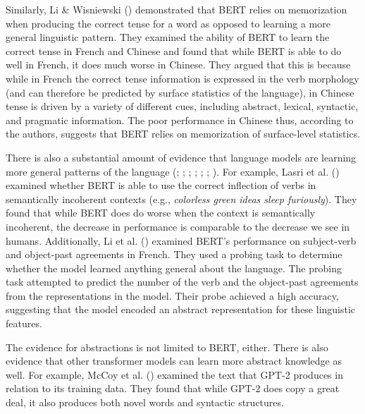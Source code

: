 \documentclass[
  12pt,
  letterpaper,
]{scrreprt}
\begin{document}
Similarly, Li \& Wisniewski
() demonstrated that BERT
relies on memorization when producing the correct tense for a word as
opposed to learning a more general linguistic pattern. They examined the
ability of BERT to learn the correct tense in French and Chinese and
found that while BERT is able to do well in French, it does much worse
in Chinese. They argued that this is because while in French the correct
tense information is expressed in the verb morphology (and can therefore
be predicted by surface statistics of the language), in Chinese tense is
driven by a variety of different cues, including abstract, lexical,
syntactic, and pragmatic information. The poor performance in Chinese
thus, according to the authors, suggests that BERT relies on
memorization of surface-level statistics.

There is also a substantial amount of evidence that language models are
learning more general patterns of the language
(;
;
;
;
;
; ). For example, Lasri et al.
() examined whether
BERT is able to use the correct inflection of verbs in semantically
incoherent contexts (e.g., \emph{colorless green ideas sleep
furiously}). They found that while BERT does do worse when the context
is semantically incoherent, the decrease in performance is comparable to
the decrease we see in humans. Additionally, Li et al.
() examined
BERT's performance on subject-verb and object-past agreements in French.
They used a probing task to determine whether the model learned anything
general about the language. The probing task attempted to predict the
number of the verb and the object-past agreements from the
representations in the model. Their probe achieved a high accuracy,
suggesting that the model encoded an abstract representation for these
linguistic features.

The evidence for abstractions is not limited to BERT, either. There is
also evidence that other transformer models can learn more abstract
knowledge as well. For example, McCoy et al.
() examined the text that
GPT-2 produces in relation to its training data. They found that while
GPT-2 does copy a great deal, it also produces both novel words and
syntactic structures.
\end{document}
